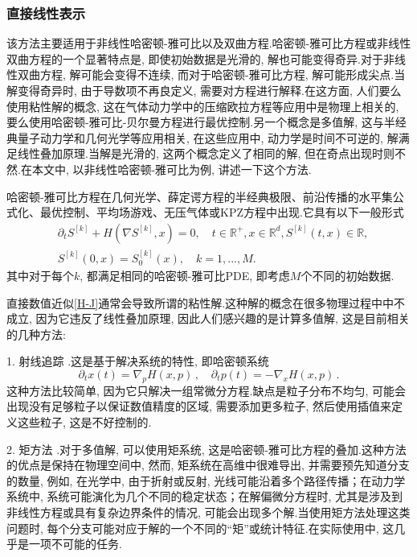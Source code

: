 \subsubsection{直接线性表示}
该方法主要适用于非线性哈密顿-雅可比以及双曲方程\cite{44}.哈密顿-雅可比方程或非线性双曲方程的一个显著特点是, 即使初始数据是光滑的, 解也可能变得奇异.对于非线性双曲方程, 解可能会变得不连续, 而对于哈密顿-雅可比方程, 解可能形成尖点.当解变得奇异时, 由于导数项不再良定义, 需要对方程进行解释.在这方面, 人们要么使用粘性解的概念, 这在气体动力学中的压缩欧拉方程等应用中是物理上相关的, 要么使用哈密顿-雅可比-贝尔曼方程进行最优控制.另一个概念是多值解, 这与半经典量子动力学和几何光学等应用相关, 在这些应用中, 动力学是时间不可逆的, 解满足线性叠加原理.当解是光滑的, 这两个概念定义了相同的解, 但在奇点出现时则不然.在本文中, 以非线性哈密顿-雅可比为例, 讲述一下这个方法.\par

哈密顿-雅可比方程在几何光学、薛定谔方程的半经典极限、前沿传播的水平集公式化、最优控制、平均场游戏、无压气体或KPZ方程中出现.它具有以下一般形式
\begin{align}
	& \partial_t S^{[k]}+ H(\nabla S^{[k]}, x) = 0, \quad t\in \mathbb{R}^+,  x \in \mathbb{R}^d, S^{[k]}(t,x)\in \mathbb{R}, \label{H-J}\\
	&S^{[k]}(0,x)=S_0^{[k]}(x), \quad k=1,...,M.
\end{align}
其中对于每个$k$, 都满足相同的哈密顿-雅可比PDE, 即考虑$M$个不同的初始数据.

直接数值近似\cref{H-J}通常会导致所谓的粘性解.这种解的概念在很多物理过程中中不成立, 因为它违反了线性叠加原理, 因此人们感兴趣的是计算多值解, 这是目前相关的几种方法:\par
1. 射线追踪 \cite{45}.这是基于解决系统的特性, 即哈密顿系统
\begin{equation}\label{H-S}
	\partial_t x(t) = \nabla_p H(x,p)\,, \quad
	\partial_t p(t) = -\nabla_x H(x,p)\,.
\end{equation}
这种方法比较简单, 因为它只解决一组常微分方程.缺点是粒子分布不均匀, 可能会出现没有足够粒子以保证数值精度的区域, 需要添加更多粒子, 然后使用插值来定义这些粒子, 这是不好控制的.\par

2. 矩方法 \cite{46}.对于多值解, 可以使用矩系统, 这是哈密顿-雅可比方程的叠加.这种方法的优点是保持在物理空间中, 然而, 矩系统在高维中很难导出, 并需要预先知道分支的数量, 例如, 在光学中, 由于折射或反射, 光线可能沿着多个路径传播；在动力学系统中, 系统可能演化为几个不同的稳定状态；在解偏微分方程时, 尤其是涉及到非线性方程或具有复杂边界条件的情况, 可能会出现多个解.当使用矩方法处理这类问题时, 每个分支可能对应于解的一个不同的“矩”或统计特征.在实际使用中, 这几乎是一项不可能的任务.\par

